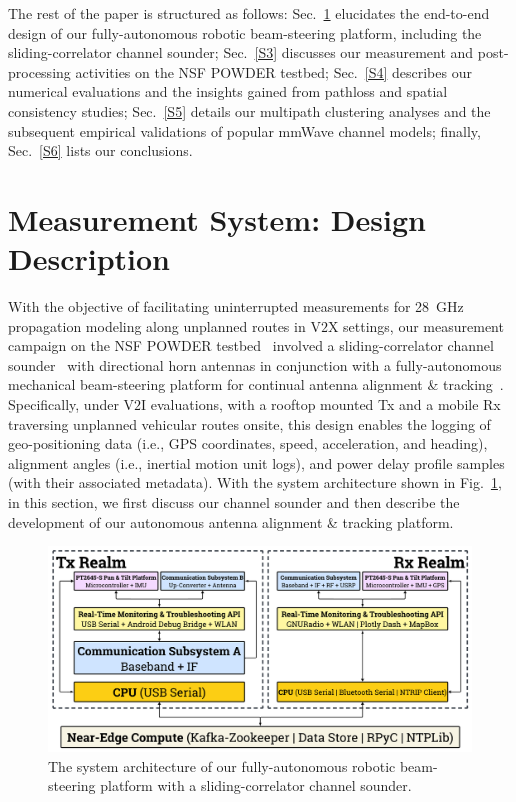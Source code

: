 \documentclass[12pt, draftcls, onecolumn]{IEEEtran}
\begin{document}
The rest of the paper is structured as follows: Sec.~\ref{S2} elucidates the end-to-end design of our fully-autonomous robotic beam-steering platform, including the sliding-correlator channel sounder; Sec.~\ref{S3} discusses our measurement and post-processing activities on the NSF POWDER testbed; Sec.~\ref{S4} describes our numerical evaluations and the insights gained from pathloss and spatial consistency studies; Sec.~\ref{S5} details our multipath clustering analyses and the subsequent empirical validations of popular mmWave channel models; finally, Sec.~\ref{S6} lists our conclusions.
\vspace{-10mm}

\section{Measurement System: Design Description}\label{S2}
With the objective of facilitating uninterrupted measurements for \SI{28}{\giga\hertz} propagation modeling along unplanned routes in V$2$X settings, our measurement campaign on the NSF POWDER testbed~\cite{POWDER} involved a sliding-correlator channel sounder~\cite{Purdue} with directional horn antennas in conjunction with a fully-autonomous mechanical beam-steering platform for continual antenna alignment \& tracking~\cite{SPAVE_NRSM}. Specifically, under V$2$I evaluations, with a rooftop mounted Tx and a mobile Rx traversing unplanned vehicular routes onsite, this design enables the logging of geo-positioning data (i.e., GPS coordinates, speed, acceleration, and heading), alignment angles (i.e., inertial motion unit logs), and power delay profile samples (with their associated metadata). With the system architecture shown in Fig.~\ref{F1}, in this section, we first discuss our channel sounder and then describe the development of our autonomous antenna alignment \& tracking platform.
\begin{figure} [t]
    \centering
    \includegraphics[width=1.0\textwidth]{figs/system_architecture.pdf}
    \vspace{-8mm}
    \caption{The system architecture of our fully-autonomous robotic beam-steering platform with a sliding-correlator channel sounder.}
    \label{F1}
\end{figure}
\end{document}
